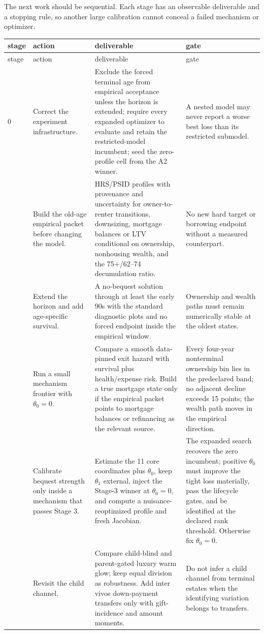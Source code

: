 \documentclass[10pt]{article}
\begin{document}
The next work should be sequential. Each stage has an observable deliverable
and a stopping rule, so another large calibration cannot conceal a failed
mechanism or optimizer.

\begin{longtable}{@{}p{}p{}p{}p{}@{}}
\toprule
stage & action & deliverable & gate \\
\midrule
\endfirsthead
\toprule
stage & action & deliverable & gate \\
\midrule
\endhead
0 & Correct the experiment infrastructure. & Exclude the forced terminal age
from empirical acceptance unless the horizon is extended; require every
expanded optimizer to evaluate and retain the restricted-model incumbent;
seed the zero-profile cell from the A2 winner. & A nested model may never
report a worse best loss than its restricted submodel. \\
\addlinespace
1 & Build the old-age empirical packet before changing the model. & HRS/PSID
profiles with provenance and uncertainty for owner-to-renter transitions,
downsizing, mortgage balances or LTV conditional on ownership, nonhousing
wealth, and the 75+/62--74 decumulation ratio. & No new hard target or
borrowing endpoint without a measured counterpart. \\
\addlinespace
2 & Extend the horizon and add age-specific survival. & A no-bequest solution
through at least the early 90s with the standard diagnostic plots and no
forced endpoint inside the empirical window. & Ownership and wealth paths
must remain numerically stable at the oldest states. \\
\addlinespace
3 & Run a small mechanism frontier with $\theta_0=0$. & Compare a smooth
data-pinned exit hazard with survival plus health/expense risk. Build a true
mortgage state only if the empirical packet points to mortgage balances or
refinancing as the relevant source. & Every four-year nonterminal ownership
bin lies in the predeclared band; no adjacent decline exceeds 15 points; the
wealth path moves in the empirical direction. \\
\addlinespace
4 & Calibrate bequest strength only inside a mechanism that passes Stage 3. &
Estimate the 11 core coordinates plus $\theta_0$, keep $\theta_1$ external,
inject the Stage-3 winner at $\theta_0=0$, and compute a nuisance-reoptimized
profile and fresh Jacobian. & The expanded search recovers the zero incumbent;
positive $\theta_0$ must improve the tight loss materially, pass the lifecycle
gates, and be identified at the declared rank threshold. Otherwise fix
$\theta_0=0$. \\
\addlinespace
5 & Revisit the child channel. & Compare child-blind and parent-gated luxury
warm glow; keep equal division as robustness. Add inter vivos down-payment
transfers only with gift-incidence and amount moments. & Do not infer a child
channel from terminal estates when the identifying variation belongs to
transfers. \\
\bottomrule
\end{longtable}
\end{document}
